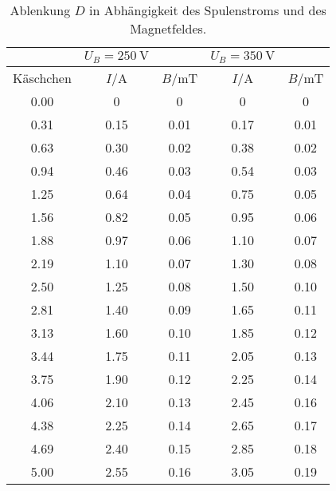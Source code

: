 \begin{table}[H]
  \centering
   \begin{tabular}{c| c c| c c}
    \toprule
    \:\:\:\:\:&  $U_B=\SI{250}{\V}$ & & $U_B=\SI{350}{\V}$& \\
    \toprule
    Käschchen & $I$/\;A & $B$/\;mT & $I$/\;A & $B$/\;mT\\
    \midrule
    0.00 & 0    & 0    &  0   & 0\\
    0.31 & 0.15 & 0.01 & 0.17 & 0.01\\
    0.63 & 0.30 & 0.02 & 0.38 & 0.02\\
    0.94 & 0.46 & 0.03 & 0.54 & 0.03\\
    1.25 & 0.64 & 0.04 & 0.75 & 0.05\\
    1.56 & 0.82 & 0.05 & 0.95 & 0.06\\
    1.88 & 0.97 & 0.06 & 1.10 & 0.07\\
    2.19 & 1.10 & 0.07 & 1.30 & 0.08\\
    2.50 & 1.25 & 0.08 & 1.50 & 0.10\\
    2.81 & 1.40 & 0.09 & 1.65 & 0.11\\
    3.13 & 1.60 & 0.10 & 1.85 & 0.12\\
    3.44 & 1.75 & 0.11 & 2.05 & 0.13\\
    3.75 & 1.90 & 0.12 & 2.25 & 0.14\\
    4.06 & 2.10 & 0.13 & 2.45 & 0.16\\
    4.38 & 2.25 & 0.14 & 2.65 & 0.17\\
    4.69 & 2.40 & 0.15 & 2.85 & 0.18\\
    5.00 & 2.55 & 0.16 & 3.05 & 0.19\\
    \bottomrule
  \end{tabular}
  \caption{Ablenkung $D$ in Abhängigkeit des Spulenstroms und des Magnetfeldes.}
  \label{tab:tab2}
\end{table}
